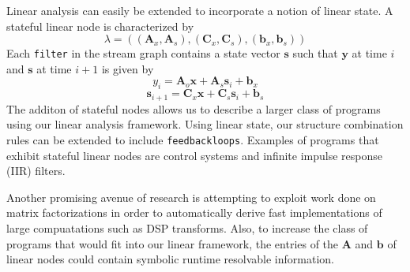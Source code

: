Linear analysis can easily be extended to incorporate a notion of
linear state.  A stateful linear node is characterized by
\begin{equation} \nonumber
\lambda=(({\mathbf A}_x, {\mathbf A}_s), ({\mathbf C}_x, {\mathbf C}_s), 
({\mathbf b}_x, {\mathbf b}_s))
\end{equation}
Each {\tt filter} in the stream graph contains a state vector
${\mathbf s}$ such that ${\mathbf y}$ at time $i$ and ${\mathbf s}$ at
time $i+1$ is given by
\begin{equation} \nonumber
y_i={\mathbf A}_o{\mathbf x} + {\mathbf A}_s{\mathbf s}_i + {\mathbf b}_x
\end{equation}
\begin{equation} \nonumber
{\mathbf s}_{i+1}={\mathbf C}_x{\mathbf x} + {\mathbf C}_s{\mathbf s}_i + {\mathbf b}_s
\end{equation}
The additon of stateful nodes allows us to describe a larger class of programs 
using our linear analysis framework.
Using linear state, our structure combination rules can be extended to include {\tt feedbackloops}.
Examples of programs that exhibit stateful linear nodes are control systems
and infinite impulse response (IIR) filters.

Another promising avenue of research is attempting to exploit work
done on matrix factorizations in order to automatically derive fast
implementations of large compuatations such as DSP transforms.  Also,
to increase the class of programs that would fit into our linear
framework, the entries of the ${\mathbf A}$ and ${\mathbf b}$ of
linear nodes could contain symbolic runtime resolvable information.

